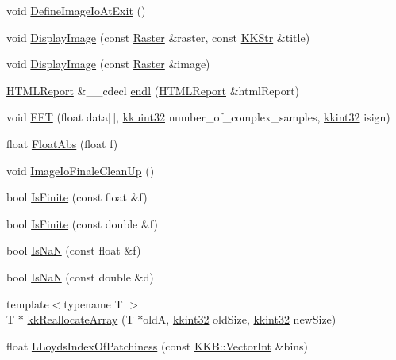 \begin{DoxyCompactItemize}
\item 
void \hyperlink{namespace_k_k_b_a1691d3827f162952dbcccd55f5330f94}{Define\+Image\+Io\+At\+Exit} ()
\item 
void \hyperlink{namespace_k_k_b_a87fa736f269523dc5f16580c76384fde}{Display\+Image} (const \hyperlink{class_k_k_b_1_1_raster}{Raster} \&raster, const \hyperlink{class_k_k_b_1_1_k_k_str}{K\+K\+Str} \&title)
\item 
void \hyperlink{namespace_k_k_b_a66dbb9784009aee05d6a4f15bfa80af1}{Display\+Image} (const \hyperlink{class_k_k_b_1_1_raster}{Raster} \&image)
\item 
\hyperlink{class_k_k_b_1_1_h_t_m_l_report}{H\+T\+M\+L\+Report} \&\+\_\+\+\_\+cdecl \hyperlink{namespace_k_k_b_ad1f50f65af6adc8fa9e6f62d007818a8}{endl} (\hyperlink{class_k_k_b_1_1_h_t_m_l_report}{H\+T\+M\+L\+Report} \&html\+Report)
\item 
void \hyperlink{namespace_k_k_b_a6477c90d7ba26120fe745205e8c645ce}{F\+FT} (float data\mbox{[}$\,$\mbox{]}, \hyperlink{namespace_k_k_b_af8d832f05c54994a1cce25bd5743e19a}{kkuint32} number\+\_\+of\+\_\+complex\+\_\+samples, \hyperlink{namespace_k_k_b_a8fa4952cc84fda1de4bec1fbdd8d5b1b}{kkint32} isign)
\item 
float \hyperlink{namespace_k_k_b_a71d9dfbbd830c4750aa8f50d93d4c0ed}{Float\+Abs} (float f)
\item 
void \hyperlink{namespace_k_k_b_ab3536a8fb1af08b1f10a3866b64741da}{Image\+Io\+Finale\+Clean\+Up} ()
\item 
bool \hyperlink{namespace_k_k_b_afad902625fe9ca2e38e057ed850641db}{Is\+Finite} (const float \&f)
\item 
bool \hyperlink{namespace_k_k_b_af10a43daa93634c3e5da3e0e38832ad0}{Is\+Finite} (const double \&f)
\item 
bool \hyperlink{namespace_k_k_b_a29cd3e80e6120bec198075818a947e54}{Is\+NaN} (const float \&f)
\item 
bool \hyperlink{namespace_k_k_b_a9f43b9751a8bb639af152d7de9ddadc9}{Is\+NaN} (const double \&d)
\item 
{\footnotesize template$<$typename T $>$ }\\T $\ast$ \hyperlink{namespace_k_k_b_a39720400d25a5a8bf690d2396914125b}{kk\+Reallocate\+Array} (T $\ast$oldA, \hyperlink{namespace_k_k_b_a8fa4952cc84fda1de4bec1fbdd8d5b1b}{kkint32} old\+Size, \hyperlink{namespace_k_k_b_a8fa4952cc84fda1de4bec1fbdd8d5b1b}{kkint32} new\+Size)
\item 
float \hyperlink{namespace_k_k_b_aec3c73eb936560f06790f08277843fe9}{L\+Loyds\+Index\+Of\+Patchiness} (const \hyperlink{namespace_k_k_b_a791ebe73f89917067a7aab9dbd817e45}{K\+K\+B\+::\+Vector\+Int} \&bins)

\end{DoxyCompactItemize}

